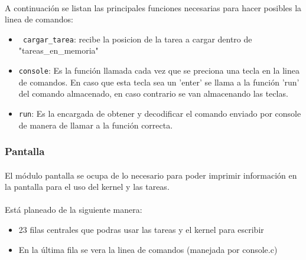 \documentclass[11pt, a4paper]{article}
\begin{document}
	\paragraph{}
	A continuación se listan las principales funciones necesarias para hacer posibles la linea de comandos:
	\begin{itemize}
		\item \texttt{ cargar\_tarea}: recibe la posicion de la tarea a cargar dentro de "tareas\_en\_memoria"
		\item \texttt{console}: Es la función llamada cada vez que se preciona una tecla en la linea de comandos. En caso que esta tecla sea un 'enter' se llama a la función 'run' del comando almacenado, en caso contrario se van almacenando las teclas.
		\item \texttt{run}: Es la encargada de obtener y decodificar el comando enviado por console de manera de llamar a la función correcta.
	\end{itemize}				


\subsubsection{Pantalla}
\label{screen}
	\paragraph{}
	El módulo pantalla se ocupa de lo necesario para poder imprimir información en la pantalla para el uso del kernel y las tareas.

	\paragraph{}
	Está planeado de la siguiente manera:
	\begin{itemize}
		\item 23 filas centrales que podras usar las tareas y el kernel para escribir
		\item En la última fila se vera la linea de comandos (manejada por console.c) 
	\end{itemize}
	 
\end{document}
